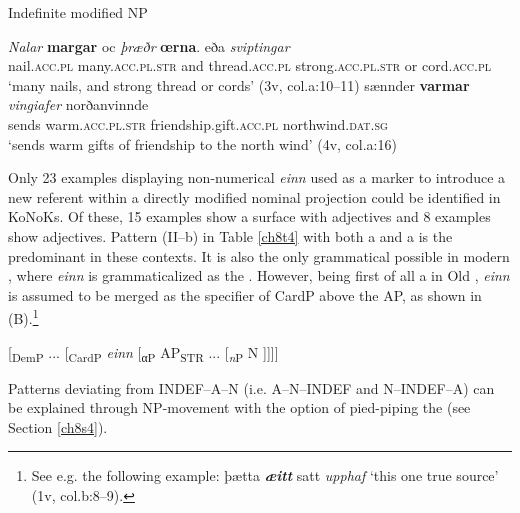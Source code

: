 \documentclass[output=paper,colorlinks,citecolor=brown]{langscibook}
\begin{document}
\begin{exe}
\ex\label{ch8ex8}Indefinite modified NP
\begin{xlist}
\ex\label{ch8ex8a}
\gll  \textit{Nalar} \textbf{margar} oc \textit{þræðr} \textbf{œrna}. eða \textit{sviptingar} \\
nail.\textsc{acc.pl} many.\textsc{acc.pl.str} and thread.\textsc{acc.pl} strong.\textsc{acc.pl.str} or cord.\textsc{acc.pl}\\
\glt `many nails, and strong thread or cords' (3v, col.a:10--11)
\ex\label{ch8ex8b}
\gll sænnder \textbf{varmar} \textit{vingiafer} norðanvinnde \\
sends warm.\textsc{acc.pl.str} friendship.gift.\textsc{acc.pl} northwind.\textsc{dat.sg}\\
\glt `sends warm gifts of friendship to the north wind' (4v, col.a:16)
\end{xlist}
\end{exe}

Only 23 examples displaying non-numerical \emph{einn} used as a marker to introduce a new referent within a directly
modified nominal projection could be identified in KoNoKs. Of these, 15
examples show a surface  with  adjectives and 8
examples show  adjectives. Pattern (II--b) in Table \ref{ch8t4} with
both a   and a   is the predominant
 in these contexts. It is also the only grammatical 
possible in modern , where \emph{einn} is grammaticalized as the
 . However, being first of all a  in Old
, \emph{einn} is assumed to be merged as the specifier of CardP
above the AP, as shown in (B).\footnote{See e.g. the following example:
  þætta \textit{\textbf{æitt}} satt \textit{upphaf} `this one
  true source' (1v, col.b:8--9).}

\begin{exe}
\label{ch8exb}   {[}\textsubscript{DemP} ... {[}\textsubscript{CardP} \emph{einn} {[}\textsubscript{αP} AP\textsubscript{STR} ... {[}\textsubscript{\emph{n}P} N {]}{]}{]}{]}
\end{exe}

Patterns deviating from INDEF--A--N (i.e. A--N--INDEF and
N--INDEF--A) can be explained through NP-movement with the option
of pied-piping the  (see Section \ref{ch8s4}).
\end{document}
